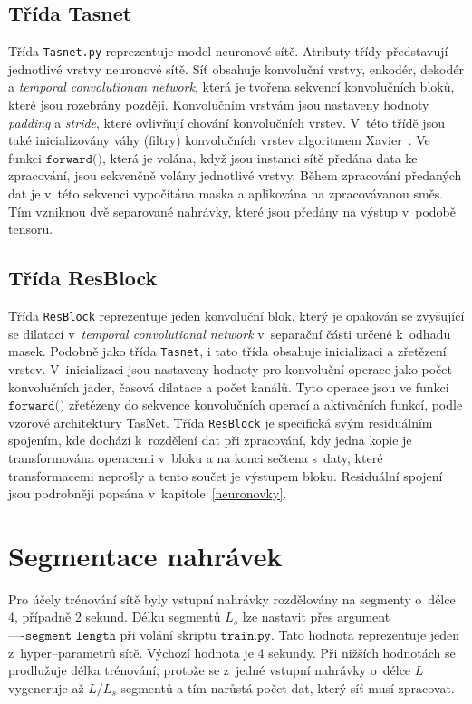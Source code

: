\subsection*{Třída Tasnet}
Třída \texttt{Tasnet.py} reprezentuje model neuronové sítě. Atributy třídy představují jednotlivé vrstvy neuronové sítě. Síť obsahuje konvoluční vrstvy, enkodér, dekodér a \textit{temporal convolutionan network}, která je tvořena sekvencí konvolučních bloků, které jsou rozebrány později. Konvolučním vrstvám jsou nastaveny hodnoty \textit{padding} a \textit{stride}, které ovlivňují chování konvolučních vrstev. V~této třídě jsou také inicializovány váhy (filtry) konvolučních vrstev algoritmem Xavier~\cite{pmlr-v9-glorot10a}. Ve funkci $\texttt{forward()}$, která je volána, když jsou instanci sítě předána data ke zpracování, jsou sekvenčně volány jednotlivé vrstvy. Během zpracování předaných dat je v~této sekvenci vypočítána maska a aplikována na zpracovávanou směs. Tím vzniknou dvě separované nahrávky, které jsou předány na výstup v~podobě tensoru. 


\subsection*{Třída ResBlock}
Třída \texttt{ResBlock} reprezentuje jeden konvoluční blok, který je opakován se zvyšující se dilatací v~\textit{temporal convolutional network} v~separační části určené k~odhadu masek. Podobně jako třída \texttt{Tasnet}, i tato třída obsahuje inicializaci a zřetězení vrstev. V~inicializaci jsou nastaveny hodnoty pro konvoluční operace jako počet konvolučních jader, časová dilatace a počet kanálů. Tyto operace jsou ve funkci $\texttt{forward()}$ zřetězeny do sekvence konvolučních operací a aktivačních funkcí, podle vzorové architektury TasNet. Třída \texttt{ResBlock} je specifická svým residuálním spojením, kde dochází k~rozdělení dat při zpracování, kdy jedna kopie je transformována operacemi v~bloku a na konci sečtena s~daty, které transformacemi neprošly a tento součet je výstupem bloku. Residuální spojení jsou podrobněji popsána v~kapitole~\ref{neuronovky}.


\section{Segmentace nahrávek}
\label{sec:segmentace}
Pro účely trénování sítě byly vstupní nahrávky rozdělovány na segmenty o~délce 4, případně 2 sekund. Délku segmentů $L_s$ lze nastavit přes argument $\texttt{----segment\_length}$ při volání skriptu $\texttt{train.py}$. Tato hodnota reprezentuje jeden z~hyper--parametrů sítě. Výchozí hodnota je 4 sekundy. Při nižších hodnotách se prodlužuje délka trénování, protože se z~jedné vstupní nahrávky o~délce $L$ vygeneruje až $L/L_s$  segmentů a tím narůstá počet dat, který síť musí zpracovat. 

